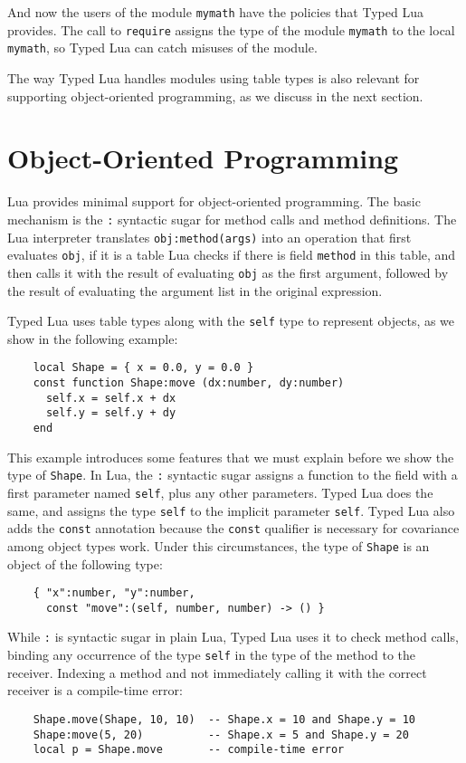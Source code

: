 And now the users of the module \texttt{mymath} have the policies that
Typed Lua provides.
The call to \texttt{require} assigns the type of the module \texttt{mymath}
to the local \texttt{mymath}, so Typed Lua can catch misuses of the module.

The way Typed Lua handles modules using table types is also
relevant for supporting object-oriented programming, as we discuss in
the next section.

\section{Object-Oriented Programming}
\label{sec:oop}

Lua provides minimal support for object-oriented programming.
The basic mechanism is the \texttt{:} syntactic sugar for method
calls and method definitions.
The Lua interpreter translates \texttt{obj:method(args)} into
an operation that first evaluates \texttt{obj}, if it is a table
Lua checks if there is field \texttt{method} in this table,
and then calls it with the result of evaluating \texttt{obj} as
the first argument, followed by the result of evaluating the
argument list in the original expression.

Typed Lua uses table types along with the \texttt{self} type to
represent objects, as we show in the following example:
\begin{verbatim}
    local Shape = { x = 0.0, y = 0.0 }
    const function Shape:move (dx:number, dy:number)
      self.x = self.x + dx
      self.y = self.y + dy
    end
\end{verbatim}

This example introduces some features that we must explain
before we show the type of \texttt{Shape}.
In Lua, the \texttt{:} syntactic sugar assigns a function to the
field with a first parameter named \texttt{self}, plus any other
parameters.
Typed Lua does the same, and assigns the type \texttt{self} to the
implicit parameter \texttt{self}.
Typed Lua also adds the \texttt{const} annotation because the
\texttt{const} qualifier is necessary for covariance among object types work.
Under this circumstances, the type of \texttt{Shape} is an object of
the following type:
\begin{verbatim}
    { "x":number, "y":number,
      const "move":(self, number, number) -> () }
\end{verbatim}

While \texttt{:} is syntactic sugar in plain Lua, Typed Lua uses it
to check method calls, binding any occurrence of the type \texttt{self}
in the type of the method to the receiver.
Indexing a method and not immediately calling it with the correct
receiver is a compile-time error:
\begin{verbatim}
    Shape.move(Shape, 10, 10)  -- Shape.x = 10 and Shape.y = 10
    Shape:move(5, 20)          -- Shape.x = 5 and Shape.y = 20
    local p = Shape.move       -- compile-time error
\end{verbatim}


